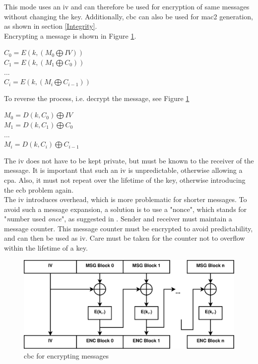 This mode uses an \gls{iv} and can therefore be used for encryption of same messages without changing the key. Additionally, \gls{cbc} can also be used
for \gls{mac2} generation, as shown in section \ref{Integrity}.
\\
Encrypting a message is shown in Figure \ref{fig:cbc_encrypt}.
\begin{center}
$ C_0 = E(k, (M_0 \bigoplus IV ) )  $
\\
$ C_1 = E(k, (M_1  \bigoplus C_0) ) $
\\
$...$
\\
$ C_i = E(k, (M_i \bigoplus C_{i-1} ) )  $
\end{center}
To reverse the process, i.e. decrypt the message, see Figure \ref{fig:cbc_encrypt}
\begin{center}
$ M_0 = D(k, C_0) \bigoplus IV $
\\
$ M_1 = D(k, C_1) \bigoplus C_0 $
\\
$...$
\\
$ M_i = D(k, C_i) \bigoplus C_{i-1} $
\end{center}
The \gls{iv} does not have to be kept private, but must be known to the receiver of the message. It is important that such an \gls{iv} is unpredictable, otherwise
allowing a \gls{cpa}. Also, it must not repeat over the lifetime of the key, otherwise introducing the \gls{ecb} problem again. 
\\
The \gls{iv} introduces overhead, which is more problematic for  shorter messages.
To avoid such a message expansion, a solution is to use a "nonce", which stands for "\textit{n}umber used \textit{once}", as suggested in \cite{cryptoEng}.
Sender and receiver must maintain a message counter. This message counter must be encrypted to avoid predictability, and can then be used as \gls{iv}. Care must
be taken for the counter not to overflow within the lifetime of a key.

\begin{figure}
    \centering
    \includegraphics[width=1\textwidth]{figures/CBCencrypt.eps}
    \caption{\gls{cbc} for encrypting messages}
    \label{fig:cbc_encrypt}
\end{figure}

